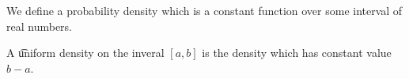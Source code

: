 

We define a probability density which is a constant function over some interval of real numbers.


A \t{uniform density} on the inveral $[a, b]$ is the density which has constant value $b - a$.
